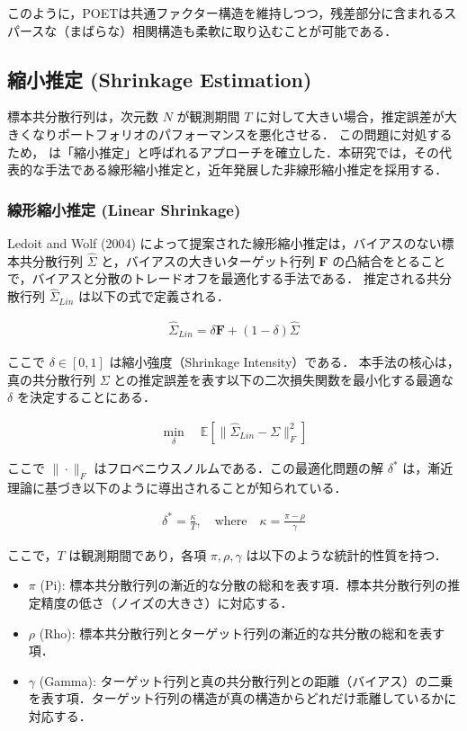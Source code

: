 \documentclass[lualatex,a4paper,11pt]{jlreq}
\begin{document}
このように，POETは共通ファクター構造を維持しつつ，残差部分に含まれるスパースな（まばらな）相関構造も柔軟に取り込むことが可能である．

\subsection{縮小推定 (Shrinkage Estimation)}
標本共分散行列は，次元数 $N$ が観測期間 $T$ に対して大きい場合，推定誤差が大きくなりポートフォリオのパフォーマンスを悪化させる．
この問題に対処するため，\citet{LedoitWolf2004} は「縮小推定」と呼ばれるアプローチを確立した．本研究では，その代表的な手法である線形縮小推定と，近年発展した非線形縮小推定を採用する．

\subsubsection{線形縮小推定 (Linear Shrinkage)}
Ledoit and Wolf (2004) によって提案された線形縮小推定は，バイアスのない標本共分散行列 $\hat{\Sigma}$ と，バイアスの大きいターゲット行列 $\symbf{F}$ の凸結合をとることで，バイアスと分散のトレードオフを最適化する手法である．
推定される共分散行列 $\hat{\Sigma}_{Lin}$ は以下の式で定義される．

\begin{align}
    \hat{\Sigma}_{Lin} = \delta \symbf{F} + (1-\delta)\hat{\Sigma}
\end{align}

ここで $\delta \in [0, 1]$ は縮小強度（Shrinkage Intensity）である．
本手法の核心は，真の共分散行列 $\Sigma$ との推定誤差を表す以下の二次損失関数を最小化する最適な $\delta$ を決定することにある．

\begin{align}
    \min_{\delta} \quad \mathbb{E}\left[ \| \hat{\Sigma}_{Lin} - \Sigma \|_F^2 \right]
\end{align}

ここで $\| \cdot \|_F$ はフロベニウスノルムである．この最適化問題の解 $\delta^*$ は，漸近理論に基づき以下のように導出されることが知られている．

\begin{align}
    \delta^* = \frac{\kappa}{T}, \quad \text{where} \quad \kappa = \frac{\pi - \rho}{\gamma}
\end{align}

ここで，$T$ は観測期間であり，各項 $\pi, \rho, \gamma$ は以下のような統計的性質を持つ．

\begin{itemize}
    \item $\pi$ (Pi): 標本共分散行列の漸近的な分散の総和を表す項．標本共分散行列の推定精度の低さ（ノイズの大きさ）に対応する．
    \item $\rho$ (Rho): 標本共分散行列とターゲット行列の漸近的な共分散の総和を表す項．
    \item $\gamma$ (Gamma): ターゲット行列と真の共分散行列との距離（バイアス）の二乗を表す項．ターゲット行列の構造が真の構造からどれだけ乖離しているかに対応する．
\end{itemize}
\end{document}
